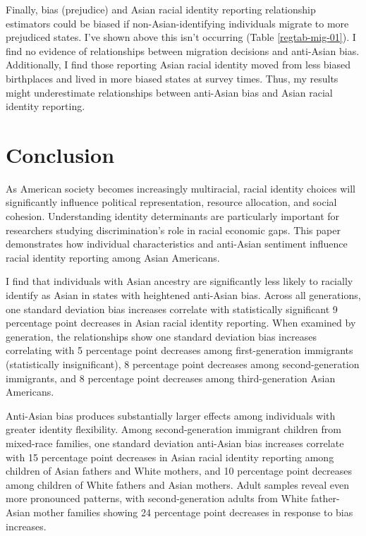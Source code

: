 Finally, bias (prejudice) and Asian racial identity reporting relationship estimators could be biased if non-Asian-identifying individuals migrate to more prejudiced states. I've shown above this isn't occurring (Table \ref{regtab-mig-01}). I find no evidence of relationships between migration decisions and anti-Asian bias. Additionally, I find those reporting Asian racial identity moved from less biased birthplaces and lived in more biased states at survey times. Thus, my results might underestimate relationships between anti-Asian bias and Asian racial identity reporting.

\section{Conclusion}\label{sec:conc}

As American society becomes increasingly multiracial, racial identity choices will significantly influence political representation, resource allocation, and social cohesion. Understanding identity determinants are particularly important for researchers studying discrimination's role in racial economic gaps. This paper demonstrates how individual characteristics and anti-Asian sentiment influence racial identity reporting among Asian Americans.

I find that individuals with Asian ancestry are significantly less likely to racially identify as Asian in states with heightened anti-Asian bias. Across all generations, one standard deviation bias increases correlate with statistically significant 9 percentage point decreases in Asian racial identity reporting. When examined by generation, the relationships show one standard deviation bias increases correlating with 5 percentage point decreases among first-generation immigrants (statistically insignificant), 8 percentage point decreases among second-generation immigrants, and 8 percentage point decreases among third-generation Asian Americans.

Anti-Asian bias produces substantially larger effects among individuals with greater identity flexibility. Among second-generation immigrant children from mixed-race families, one standard deviation anti-Asian bias increases correlate with 15 percentage point decreases in Asian racial identity reporting among children of Asian fathers and White mothers, and 10 percentage point decreases among children of White fathers and Asian mothers. Adult samples reveal even more pronounced patterns, with second-generation adults from White father-Asian mother families showing 24 percentage point decreases in response to bias increases.

